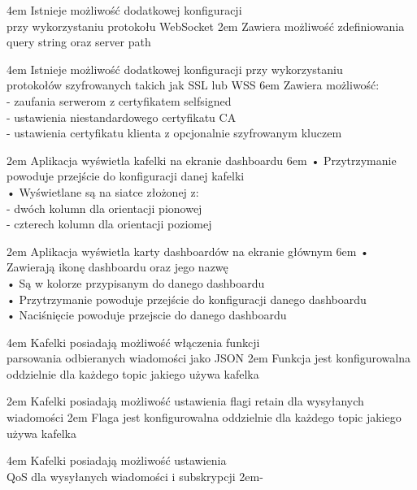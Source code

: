{4em}{
    Istnieje możliwość dodatkowej konfiguracji\\
    przy wykorzystaniu protokołu WebSocket
}
{2em}{
    Zawiera możliwość zdefiniowania query string oraz server path
}

{4em}{
    Istnieje możliwość dodatkowej konfiguracji przy wykorzystaniu\\
    protokołów szyfrowanych takich jak SSL lub WSS
}
{6em}{
    Zawiera możliwość:\\
    - zaufania serwerom z certyfikatem selfsigned\\
    - ustawienia niestandardowego certyfikatu CA\\
    - ustawienia certyfikatu klienta z opcjonalnie szyfrowanym kluczem
}

{2em}{ 
    Aplikacja wyświetla kafelki na ekranie dashboardu
}
{6em}{
    • Przytrzymanie powoduje przejście do konfiguracji danej kafelki\\
    • Wyświetlane są na siatce złożonej z:\\
    - dwóch kolumn dla orientacji pionowej\\
    - czterech kolumn dla orientacji poziomej
}

{2em}{
    Aplikacja wyświetla karty dashboardów na ekranie głównym
}
{6em}{
    • Zawierają ikonę dashboardu oraz jego nazwę\\
    • Są w kolorze przypisanym do danego dashboardu\\
    • Przytrzymanie powoduje przejście do konfiguracji danego dashboardu\\
    • Naciśnięcie powoduje przejscie do danego dashboardu
}

{4em}{
    Kafelki posiadają możliwość włączenia funkcji\\
    parsowania odbieranych wiadomości jako JSON
}
{2em}{
    Funkcja jest konfigurowalna oddzielnie dla każdego topic jakiego używa kafelka
}

{2em}{
    Kafelki posiadają możliwość ustawienia flagi retain dla wysyłanych wiadomości
}
{2em}{
    Flaga jest konfigurowalna oddzielnie dla każdego topic jakiego używa kafelka
}

{4em}{
    Kafelki posiadają możliwość ustawienia\\
    QoS dla wysyłanych wiadomości i subskrypcji
}
{2em}{-}

